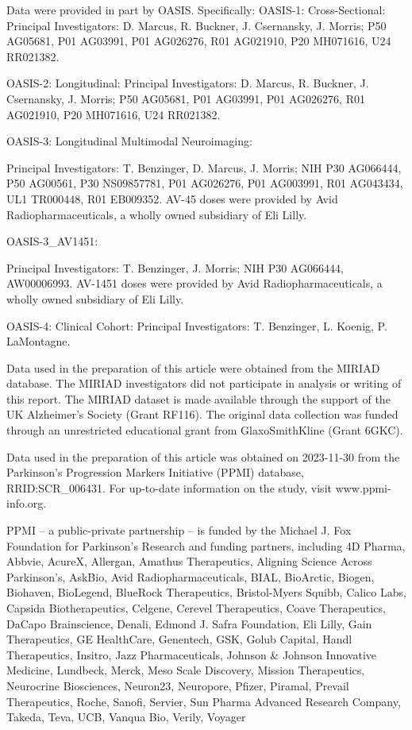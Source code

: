 \documentclass[pdflatex,sn-nature]{sn-jnl}%
\theoremstyle{thmstyleone}%
\theoremstyle{thmstyletwo}%
\theoremstyle{thmstylethree}%
\begin{document}
\begin{appendices}
Data were provided in part by OASIS. Specifically:
OASIS-1: Cross-Sectional: Principal Investigators: D. Marcus, R. Buckner, J. Csernansky, J. Morris; P50 AG05681, P01 AG03991, P01 AG026276, R01 AG021910, P20 MH071616, U24 RR021382.


OASIS-2: Longitudinal: Principal Investigators: D. Marcus, R. Buckner, J. Csernansky, J. Morris; P50 AG05681, P01 AG03991, P01 AG026276, R01 AG021910, P20 MH071616, U24 RR021382.


OASIS-3: Longitudinal Multimodal Neuroimaging: 

Principal Investigators: T. Benzinger, D. Marcus, J. Morris; NIH P30 AG066444, P50 AG00561, P30 NS09857781, P01 AG026276, P01 AG003991, R01 AG043434, UL1 TR000448, R01 EB009352. AV-45 doses were provided by Avid Radiopharmaceuticals, a wholly owned subsidiary of Eli Lilly.


OASIS-3\_AV1451: 

Principal Investigators: T. Benzinger, J. Morris; NIH P30 AG066444, AW00006993. AV-1451 doses were provided by Avid Radiopharmaceuticals, a wholly owned subsidiary of Eli Lilly.


OASIS-4: Clinical Cohort: Principal Investigators: T. Benzinger, L. Koenig, P. LaMontagne.


Data used in the preparation of this article were obtained from the MIRIAD database. The MIRIAD investigators did not participate in analysis or writing of this report. The MIRIAD dataset is made available through the support of the UK Alzheimer's Society (Grant RF116). The original data collection was funded through an unrestricted educational grant from GlaxoSmithKline (Grant 6GKC).


Data used in the preparation of this article was obtained on 2023-11-30 from the Parkinson’s Progression Markers Initiative (PPMI) database, RRID:SCR\_006431. For up-to-date information on the study, visit www.ppmi-info.org. 


PPMI – a public-private partnership – is funded by the Michael J. Fox Foundation for Parkinson’s Research and funding partners, including 4D Pharma, Abbvie, AcureX, Allergan, Amathus Therapeutics, Aligning Science Across Parkinson's, AskBio, Avid Radiopharmaceuticals, BIAL, BioArctic, Biogen, Biohaven, BioLegend, BlueRock Therapeutics, Bristol-Myers Squibb, Calico Labs, Capsida Biotherapeutics, Celgene, Cerevel Therapeutics, Coave Therapeutics, DaCapo Brainscience, Denali, Edmond J. Safra Foundation, Eli Lilly, Gain Therapeutics, GE HealthCare, Genentech, GSK, Golub Capital, Handl Therapeutics, Insitro, Jazz Pharmaceuticals, Johnson \& Johnson Innovative Medicine, Lundbeck, Merck, Meso Scale Discovery, Mission Therapeutics, Neurocrine Biosciences, Neuron23, Neuropore, Pfizer, Piramal, Prevail Therapeutics, Roche, Sanofi, Servier, Sun Pharma Advanced Research Company, Takeda, Teva, UCB, Vanqua Bio, Verily, Voyager


\end{appendices}
\end{document}
